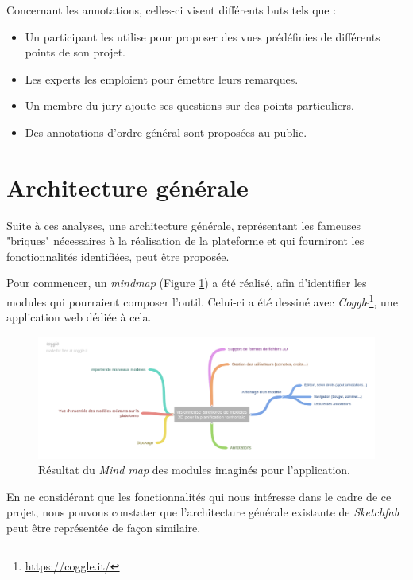 Concernant les annotations, celles-ci visent différents buts tels que :
\begin{itemize}
    \item Un participant les utilise pour proposer des vues prédéfinies de différents points de son projet.
    \item Les experts les emploient pour émettre leurs remarques.
    \item Un membre du jury ajoute ses questions sur des points particuliers.
    \item Des annotations d'ordre général sont proposées au public.
\end{itemize}

\section{Architecture générale}
\label{sec:global-architecture}

Suite à ces analyses, une architecture générale, représentant les fameuses "briques" nécessaires à la réalisation de la plateforme et qui fourniront les fonctionnalités identifiées, peut être proposée.

Pour commencer, un \textit{mindmap} (Figure \ref{fig:mip-viewer-mindmap}) a été réalisé, afin d'identifier les modules qui pourraient composer l'outil.
Celui-ci a été dessiné avec \textit{Coggle}\footnote{\url{https://coggle.it/}}, une application web dédiée à cela.

\begin{figure}[h]
    \centering
    \includegraphics[width=\linewidth]{Figures/mip-viewer-mindmap.png}
    \captionsetup{width=0.9\textwidth}
    \caption{Résultat du \textit{Mind map} des modules imaginés pour l'application.}
    \label{fig:mip-viewer-mindmap}
\end{figure}

En ne considérant que les fonctionnalités qui nous intéresse dans le cadre de ce projet, nous pouvons constater que l'architecture générale existante de \textit{Sketchfab} peut être représentée de façon similaire.


